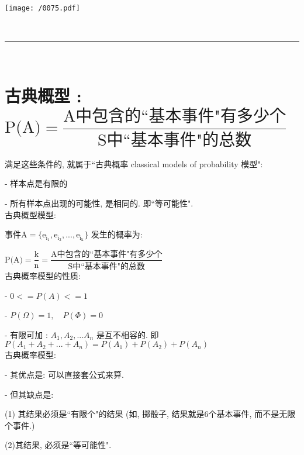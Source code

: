\documentclass[UTF8]{ctexart}
\begin{document}
	
	\begin{myEnvSample}
	\texttt{[image: /0075.pdf]}
\end{myEnvSample}


~\\
\hrule
~\\


\section{古典概型 : $\text{P(A)}=\dfrac{\text{A中包含的``基本事件"有多少个}}{\text{S中``基本事件"的总数}}$}


满足这些条件的, 就属于``古典概率  classical models of probability 模型":

- 样本点是有限的

- 所有样本点出现的可能性, 是相同的. 即``等可能性". \\


古典概型模型:

事件$\text{A}=\{\text{e}_{\text{i}_1},\text{e}_{\text{i}_2},...,\text{e}_{\text{i}_{\text{k}}}\}$ 发生的概率为:

$
\text{P(A)}=\dfrac{\text{k}}{\text{n}}=\dfrac{\text{A中包含的``基本事件"有多少个}}{\text{S中``基本事件"的总数}}
$ \\


古典概率模型的性质:

- $0 <= P(A) <= 1$

- $P(\Omega)=1, \quad  P(\Phi)=0$

- 有限可加 : $ A_1, A_2, ... A_n$ 是互不相容的. 即 $P(A_1 +A_2 + ...+ A_n)= P(A_1) +  P(A_2)  + P(A_n)$ \\

古典概率模型: 

- 其优点是: 可以直接套公式来算. 

- 但其缺点是: 

(1) 其结果必须是``有限个"的结果 (如, 掷骰子, 结果就是6个基本事件, 而不是无限个事件.) 

(2)其结果, 必须是``等可能性". \\


	
\end{document}
